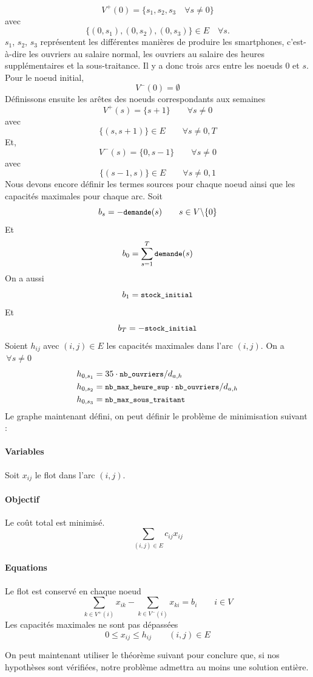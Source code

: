\[ V^{+}(0) = \{s_1, s_2, s_3 \quad \forall s \ne 0\} \]
avec
\[ \{(0, s_1), (0, s_2), (0, s_3)\} \in E \quad \forall s. \]
$s_1$, $s_2$, $s_3$ représentent les différentes manières de produire les smartphones, c'est-à-dire les ouvriers au salaire normal, les ouvriers au salaire des heures supplémentaires et la sous-traitance.
Il y a donc trois arcs entre les noeuds $0$ et $s$.
Pour le noeud initial,
\[ V^{-}(0) = \emptyset \]
Définissons ensuite les arêtes des noeuds correspondants aux semaines
\[ V^{+}(s) = \{s+1\} \qquad \forall s \ne 0 \]
avec 
\[ \{(s, s+1)\} \in E \qquad \forall s \ne 0, T \]
Et,
\[ V^{-}(s) = \{0, s-1\} \qquad \forall s \ne 0 \]
avec
\[ \{(s-1, s)\} \in E \qquad \forall s \ne 0, 1 \]
Nous devons encore définir les termes sources pour chaque noeud ainsi que les capacités maximales pour chaque arc.
Soit
\[ b_s = - {\small\texttt{demande}}(s) \qquad s \in V \backslash \{0\} \]
Et 
\[ b_0 = \sum_{s=1}^{T} {\small\texttt{demande}}(s) \]  
On a aussi
\[ b_1 = {\small\texttt{stock\_initial}} \]
Et
\[ b_T = - {\small\texttt{stock\_initial}} \]
Soient $h_{ij}$ avec $(i, j) \in E$ les capacités maximales dans l'arc $(i, j)$.
On a $\, \forall s \ne 0$ 
\begin{align*}
  h_{0, s_1} &= 35\cdot {\small\texttt{nb\_ouvriers}}/ d_{a,h} \\
  h_{0, s_2} &= {\small\texttt{nb\_max\_heure\_sup}}\cdot{\small\texttt{nb\_ouvriers}}/ d_{a,h} \\
  h_{0, s_3} &= {\small\texttt{nb\_max\_sous\_traitant}} 
\end{align*}
Le graphe maintenant défini, 
on peut définir le problème de minimisation suivant :
\paragraph{Variables}
Soit $x_{ij}$ le flot dans l'arc $(i, j)$.
\paragraph{Objectif}
Le coût total est minimisé.
\[ \sum_{(i, j) \in E} c_{ij} x_{ij} \]
\paragraph{Equations} Le flot est conservé en chaque noeud
\[ \sum_{k \in V^{+}(i)} x_{ik} - \sum_{k \in V^{-}(i)} x_{ki} 
  = b_i \qquad i \in V
\]
Les capacités maximales ne sont pas dépassées
\[ 0 \leq x_{ij} \leq h_{ij} \qquad (i, j) \in E \]

On peut maintenant utiliser le théorème suivant pour conclure que, si nos hypothèses sont vérifiées, notre problème admettra au moins une solution entière.
